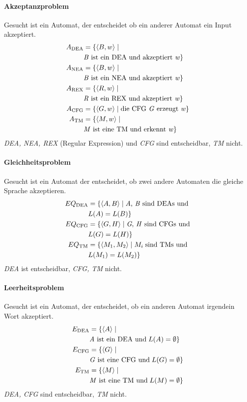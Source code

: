 \paragraph{Akzeptanzproblem} Gesucht ist ein Automat, der entscheidet ob ein anderer Automat ein Input akzeptiert.
\begin{align*}
    A_{\text{DEA}} &= \{ \langle B, w \rangle \mid \\ 
    &\text{\textit{B} ist ein DEA und akzeptiert \textit{w}} \} \\
    A_{\text{NEA}} &= \{ \langle B, w \rangle \mid \\ 
    &\text{\textit{B} ist ein NEA und akzeptiert \textit{w}} \} \\
    A_{\text{REX}} &= \{ \langle R, w \rangle \mid \\
    &\text{\textit{R} ist ein REX und akzeptiert \textit{w}} \} \\
    A_{\text{CFG}} &= \{ \langle G, w \rangle \mid \text{die CFG \textit{G} erzeugt \textit{w}}\} \\
    A_{\text{TM}} &= \{ \langle M, w \rangle \mid \\
    &\text{\textit{M} ist eine TM und erkennt \textit{w}} \}
\end{align*}
\textit{DEA, NEA, REX} (Regular Expression) und \textit{CFG} sind entscheidbar, \textit{TM} nicht.
\paragraph{Gleichheitsproblem} Gesucht ist ein Automat der entscheidet, ob zwei andere Automaten die gleiche Sprache akzeptieren.
\begin{align*}
    EQ_\text{DEA} &= \{ \langle A, B \rangle \mid \text{\textit{A}, \textit{B} sind DEAs und} \\
    & L(A) = L(B) \} \\
    EQ_\text{CFG} &= \{ \langle G, H \rangle \mid \text{\textit{G}, \textit{H} sind CFGs und}\\
    & L(G) = L(H) \} \\
    EQ_\text{TM} &= \{ \langle M_1, M_2 \rangle \mid M_i \;\text{sind TMs und}\; \\
    &L(M_1) = L(M_2) \}
\end{align*}
\textit{DEA} ist entscheidbar, \textit{CFG, TM} nicht.
\paragraph{Leerheitsproblem} Gesucht ist ein Automat, der entscheidet, ob ein anderen Automat irgendein Wort akzeptiert.
\begin{align*}
    E_{\text{DEA}} &= \{ \langle A \rangle \mid \\
    &\text{\textit{A} ist ein DEA und} \; L(A) = \emptyset \} \\
    E_\text{CFG} &= \{  \langle G \rangle \mid \\
    & \text{\textit{G} ist eine CFG und} \; L(G) = \emptyset \} \\
    E_\text{TM} &= \{ \langle M \rangle \mid \\
    &\text{\textit{M} ist eine TM und} \; L(M) = \emptyset \}
\end{align*}
\textit{DEA, CFG} sind entscheidbar, \textit{TM} nicht.
